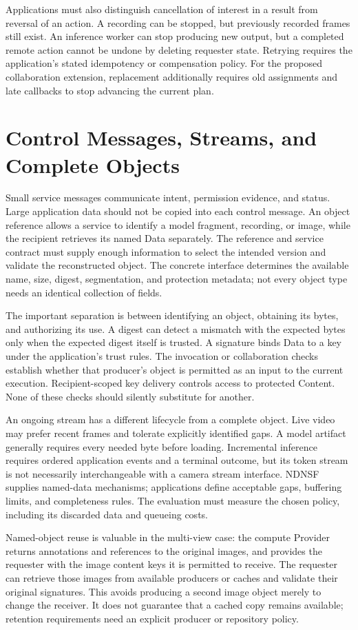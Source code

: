 Applications must also distinguish cancellation of interest in a result from reversal of an action. A recording can be stopped, but previously recorded frames still exist. An inference worker can stop producing new output, but a completed remote action cannot be undone by deleting requester state. Retrying requires the application's stated idempotency or compensation policy. For the proposed collaboration extension, replacement additionally requires old assignments and late callbacks to stop advancing the current plan.

\section{Control Messages, Streams, and Complete Objects}
Small service messages communicate intent, permission evidence, and status. Large application data should not be copied into each control message. An object reference allows a service to identify a model fragment, recording, or image, while the recipient retrieves its named Data separately. The reference and service contract must supply enough information to select the intended version and validate the reconstructed object. The concrete interface determines the available name, size, digest, segmentation, and protection metadata; not every object type needs an identical collection of fields.

The important separation is between identifying an object, obtaining its bytes, and authorizing its use. A digest can detect a mismatch with the expected bytes only when the expected digest itself is trusted. A signature binds Data to a key under the application's trust rules. The invocation or collaboration checks establish whether that producer's object is permitted as an input to the current execution. Recipient-scoped key delivery controls access to protected Content. None of these checks should silently substitute for another.

An ongoing stream has a different lifecycle from a complete object. Live video may prefer recent frames and tolerate explicitly identified gaps. A model artifact generally requires every needed byte before loading. Incremental inference requires ordered application events and a terminal outcome, but its token stream is not necessarily interchangeable with a camera stream interface. NDNSF supplies named-data mechanisms; applications define acceptable gaps, buffering limits, and completeness rules. The evaluation must measure the chosen policy, including its discarded data and queueing costs.

Named-object reuse is valuable in the multi-view case: the compute Provider returns annotations and references to the original images, and provides the requester with the image content keys it is permitted to receive. The requester can retrieve those images from available producers or caches and validate their original signatures. This avoids producing a second image object merely to change the receiver. It does not guarantee that a cached copy remains available; retention requirements need an explicit producer or repository policy.
